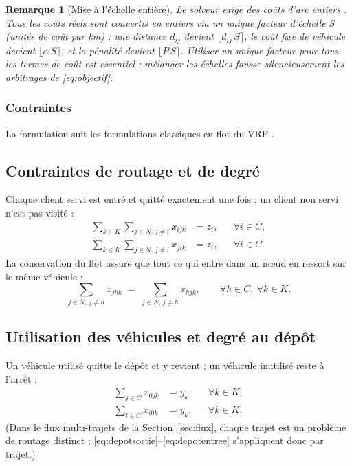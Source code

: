 \documentclass[12pt,a4paper]{report}
\newtheorem{remarque}{Remarque}
\begin{document}
\begin{remarque}[Mise à l'échelle entière]
Le solveur exige des coûts d'arc entiers \cite{ortools}. Tous les coûts
réels sont convertis en entiers via un unique facteur d'échelle $S$ (unités
de coût par km) : une distance $d_{ij}$ devient $\lfloor d_{ij}\, S \rceil$,
le coût fixe de véhicule devient $\lfloor \alpha\, S \rceil$, et la pénalité
devient $\lfloor P\, S \rceil$. Utiliser un \emph{unique} facteur pour
\emph{tous} les termes de coût est essentiel ; mélanger les échelles fausse
silencieusement les arbitrages de \eqref{eq:objectif}.
\end{remarque}

\subsubsection{Contraintes}

La formulation suit les formulations classiques en flot du VRP
\cite{toth2014,solomon1987}.

\subsection{Contraintes de routage et de degré}

Chaque client servi est entré et quitté exactement une fois ; un client non
servi n'est pas visité :
%
\begin{align}
  \sum_{k \in K} \sum_{j \in N,\, j \neq i} x_{ijk} &= z_i,
    && \forall i \in C, \label{eq:sortie}\\
  \sum_{k \in K} \sum_{j \in N,\, j \neq i} x_{jik} &= z_i,
    && \forall i \in C. \label{eq:entree}
\end{align}
%
La conservation du flot assure que tout ce qui entre dans un nœud en ressort
sur le même véhicule :
%
\begin{equation}
  \sum_{j \in N,\, j \neq h} x_{jhk}
  \;=\;
  \sum_{j \in N,\, j \neq h} x_{hjk},
  \qquad \forall h \in C,\ \forall k \in K.
  \label{eq:flot}
\end{equation}

\subsection{Utilisation des véhicules et degré au dépôt}

Un véhicule utilisé quitte le dépôt et y revient ; un véhicule inutilisé
reste à l'arrêt :
%
\begin{align}
  \sum_{j \in C} x_{0jk} &= y_k, && \forall k \in K, \label{eq:depotsortie}\\
  \sum_{i \in C} x_{i0k} &= y_k, && \forall k \in K. \label{eq:depotentree}
\end{align}
%
(Dans le flux multi-trajets de la Section~\ref{sec:flux}, chaque trajet est
un problème de routage distinct ; \eqref{eq:depotsortie}--\eqref{eq:depotentree}
s'appliquent donc par trajet.)
\end{document}
